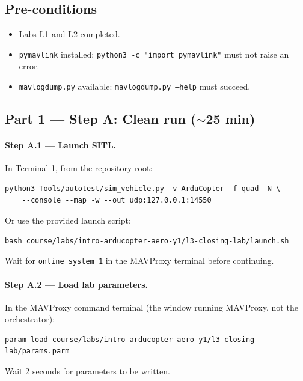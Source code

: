 \documentclass[a4paper,11pt,twoside]{article}
\begin{document}
\subsection*{Pre-conditions}
\begin{itemize}
  \item Labs L1 and L2 completed.
  \item \texttt{pymavlink} installed: \texttt{python3 -c "import pymavlink"} must not raise an error.
  \item \texttt{mavlogdump.py} available: \texttt{mavlogdump.py --help} must succeed.
\end{itemize}

\subsection*{Part 1 --- Step A: Clean run ($\sim$25 min)}

\paragraph{Step A.1 --- Launch SITL.}
In Terminal 1, from the repository root:

\begin{Verbatim}[frame=single,fontsize=\small]
python3 Tools/autotest/sim_vehicle.py -v ArduCopter -f quad -N \
    --console --map -w --out udp:127.0.0.1:14550
\end{Verbatim}

Or use the provided launch script:

\begin{Verbatim}[frame=single,fontsize=\small]
bash course/labs/intro-arducopter-aero-y1/l3-closing-lab/launch.sh
\end{Verbatim}

Wait for \texttt{online system 1} in the MAVProxy terminal before continuing.

\paragraph{Step A.2 --- Load lab parameters.}
In the MAVProxy command terminal (the window running MAVProxy, not the orchestrator):

\begin{Verbatim}[frame=single,fontsize=\small]
param load course/labs/intro-arducopter-aero-y1/l3-closing-lab/params.parm
\end{Verbatim}

Wait 2 seconds for parameters to be written.
\end{document}
